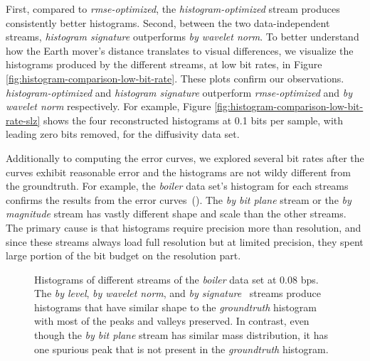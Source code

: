 First, compared to \emph{rmse-optimized}, the \emph{histogram-optimized} stream produces
consistently better histograms. Second, between the two data-independent streams, \emph{histogram
signature} outperforms \emph{by wavelet norm}. To better understand how the Earth mover's distance
translates to visual differences, we visualize the histograms produced by the different streams, at
low bit rates, in Figure \ref{fig:histogram-comparison-low-bit-rate}. These plots confirm our
observations.
\emph{histogram-optimized} and \emph{histogram signature}
outperform \emph{rmse-optimized} and \emph{by wavelet norm} respectively. For example, Figure
\ref{fig:histogram-comparison-low-bit-rate-slz} shows the four reconstructed histograms at 0.1 bits
per sample, with leading zero bits removed, for the diffusivity data set.

Additionally to computing the error curves, we explored several bit rates after the curves exhibit
reasonable error and the histograms are not wildy different from the groundtruth. For example, the {\em boiler}
data set's histogram for each streams confirms the results from the error curves~().
The {\em by bit plane} stream or the {\em by magnitude} stream has vastly different shape and scale than the other
streams. The primary cause is that histograms require precision more than resolution, and since these streams
always load full resolution but at limited precision, they spent large portion of the bit budget on the resolution part.

\begin{figure}[h]
	\centering
	\caption{Histograms of different streams of the \emph{boiler} data set at 0.08 bps. The
        {\em by level}, {\em by wavelet norm}, and {\em by signature}~ streams
        produce histograms that have similar shape to the {\em groundtruth} histogram with most of the peaks and valleys
        preserved. In contrast, even though the {\em by bit plane} stream has similar mass distribution, it has one spurious
        peak that is not present in the {\em groundtruth} histogram.
        }
	\label{fig:histograms-boiler}
\end{figure}

